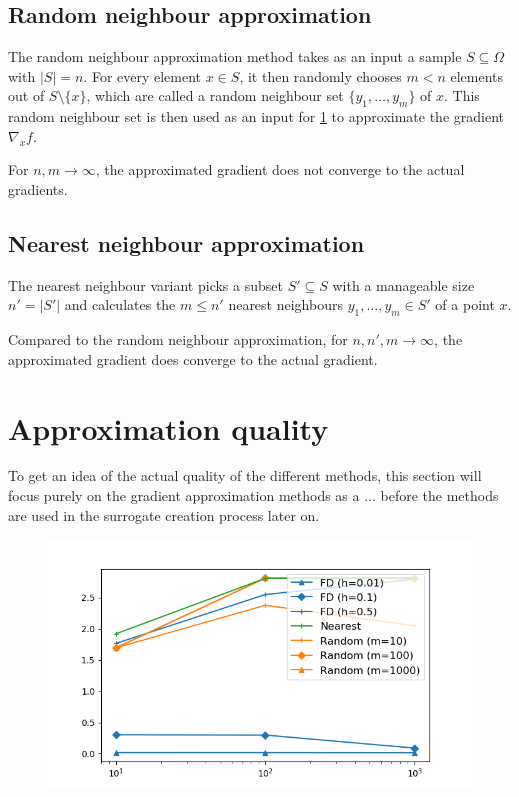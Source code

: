 \documentclass[
  a4paper,  %
  twoside,  %
  bibliography=totoc,
  headsepline,
  cleardoublepage=empty,
  parskip=half,
  draft=false
]{scrbook}
\begin{document}
\subsection{Random neighbour approximation}

The random neighbour approximation method takes as an input a sample $S \subseteq \Omega$ with $|S|=n$.
For every element $x \in S$, it then randomly chooses $m < n$ elements out of $S \setminus \{x\}$, which are called a random neighbour set $\{y_1, \dots, y_m\}$ of $x$.
This random neighbour set is then used as an input for \ref{} to approximate the gradient $\nabla_x f$.

For $n,m \to \infty$, the approximated gradient does not converge to the actual gradients.

\subsection{Nearest neighbour approximation}

The nearest neighbour variant picks a subset $S' \subseteq S$ with a manageable size $n'=|S'|$ and calculates the $m \leq n'$ nearest neighbours $y_1,\dots,y_m \in S'$ of a point $x$.

Compared to the random neighbour approximation, for $n,n',m \to \infty$, the approximated gradient does converge to the actual gradient.

\section{Approximation quality}

To get an idea of the actual quality of the different methods, this section will focus purely on the gradient approximation methods as a ... before the methods are used in the surrogate creation process later on.


\begin{figure}[H]
\begin{center}
	\includegraphics[width=\textwidth]{graphics/as_mc_errors}
\end{center}
	\label{fig:as_approx}
\end{figure}
\end{document}
